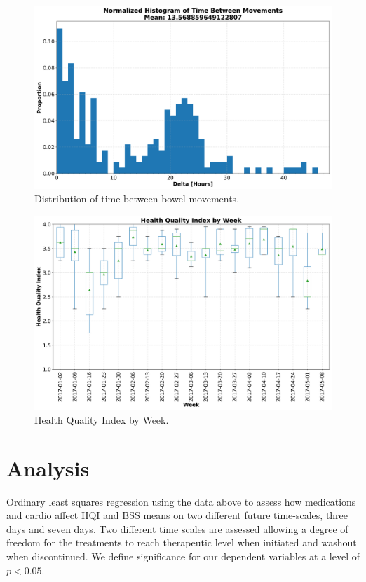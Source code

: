 \documentclass[conference]{IEEEtran}
\begin{document}
\begin{figure}[t]
    \centering
    \includegraphics[width=\columnwidth]{time_between_movements.png}
    \caption{Distribution of time between bowel movements.}\label{fig:time_between_movements}
\end{figure}


\begin{figure}[t]
    \centering
    \includegraphics[width=\columnwidth]{hqi_box.png}
    \caption{Health Quality Index by Week.}\label{fig:hqi}
\end{figure}

\section{Analysis}

Ordinary least squares regression using the data above to assess how medications and cardio affect HQI and BSS means on two different future time-scales, three days and seven days.  Two different time scales are assessed allowing a degree of freedom for the treatments to reach therapeutic level when initiated and washout when discontinued.  We define significance for our dependent variables at a level of $p<0.05$.
\end{document}
